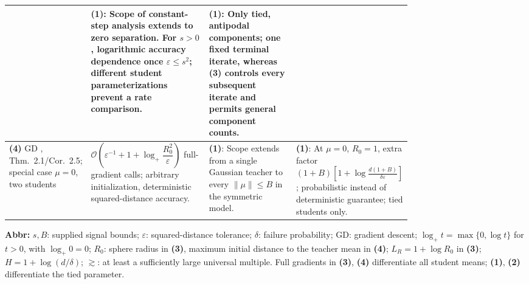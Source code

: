 \begin{table}[tp]
\begin{threeparttable}
\begin{tabularx}{\linewidth}{@{}>{\raggedright\arraybackslash}p{0.20\linewidth}>{\raggedright\arraybackslash}p{0.32\linewidth}>{\raggedright\arraybackslash}p{0.25\linewidth}>{\raggedright\arraybackslash}X@{}}
& \textbf{(1)}: Scope of constant-step analysis extends to zero separation. For $s>0$, logarithmic accuracy dependence once $\varepsilon\le s^2$; different student parameterizations prevent a rate comparison.
& \textbf{(1)}: Only tied, antipodal components; one fixed terminal iterate, whereas \textbf{(3)} controls every subsequent iterate and permits general component counts. \\
\midrule
\textbf{(4)} GD \citep{srfTyurin2026v1}, Thm.~2.1/Cor.~2.5; special case $\mu=0$, two students
& $\mathcal{O}\!\left(\varepsilon^{-1}+1+\log_+\dfrac{R_0^2}{\varepsilon}\right)$ full-gradient calls; arbitrary initialization, deterministic squared-distance accuracy.
& \textbf{(1)}: Scope extends from a single Gaussian teacher to every $\|\mu\|\le B$ in the symmetric model.
& \textbf{(1)}: At $\mu=0$, $R_0=1$, extra factor $(1+B)[1+\log\frac{d(1+B)}{\delta\varepsilon}]$; probabilistic instead of deterministic guarantee; tied students only. \\
\bottomrule
\end{tabularx}
\begin{tablenotes}[flushleft]\footnotesize
\item[] \textbf{Abbr:} $s,B$: supplied signal bounds; $\varepsilon$: squared-distance tolerance; $\delta$: failure probability; GD: gradient descent; $\log_+t=\max\{0,\log t\}$ for $t>0$, with $\log_+0=0$; $R_0$: sphere radius in \textbf{(3)}, maximum initial distance to the teacher mean in \textbf{(4)}; $L_R=1+\log R_0$ in \textbf{(3)}; $H=1+\log(d/\delta)$; $\gtrsim$: at least a sufficiently large universal multiple. Full gradients in \textbf{(3)}, \textbf{(4)} differentiate all student means; \textbf{(1)}, \textbf{(2)} differentiate the tied parameter.
\end{tablenotes}
\end{threeparttable}
\end{table}
\clearpage
